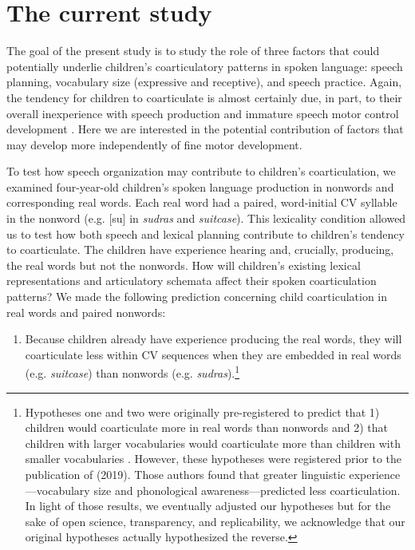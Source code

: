 \documentclass[a4paper,man,natbib,donotrepeattitle, apacite]{apa6}
\begin{document}
\section{The current study}

The goal of the present study is to study the role of three factors that could potentially underlie children’s coarticulatory patterns in spoken language: speech planning, vocabulary size (expressive and receptive), and speech practice. Again, the tendency for children to coarticulate is almost certainly due, in part, to their overall inexperience with speech production and immature speech motor control development \cite{barbierWhatAnticipatoryCoarticulation2020,goffmanRelationsSegmentalMotor2007,greenPhysiologicDevelopmentSpeech2000,rubertusDevelopmentGesturalOrganization2018,zharkovaDynamicsVoicelessSibilant2018}. Here we are interested in the potential contribution of factors that may develop more independently of fine motor development. 

To test how speech organization may contribute to children’s coarticulation, we examined four-year-old children’s spoken language production in nonwords and corresponding real words. Each real word had a paired, word-initial CV syllable in the nonword (e.g. [su] in \textit{sudras} and \textit{suitcase}). This lexicality condition allowed us to test how both speech and lexical planning contribute to children’s tendency to coarticulate. The children have experience hearing and, crucially, producing, the real words but not the nonwords. How will children’s existing lexical representations and articulatory schemata affect their spoken coarticulation patterns? We made the following prediction concerning child coarticulation in real words and paired nonwords:

\begin{enumerate}
\item[1.] Because children already have experience producing the real words, they will coarticulate less within CV sequences when they are embedded in real words (e.g. \textit{suitcase}) than nonwords (e.g. \textit{sudras}).\footnote{Hypotheses one and two were originally pre-registered to predict that 1) children would coarticulate more in real words than nonwords and 2) that children with larger vocabularies would coarticulate more than children with smaller vocabularies \cite{cychoszSpectralTemporalMeasures2019}. However, these hypotheses were registered prior to the publication of \citeauthor{noiraySpokenLanguageDevelopment2019} (2019). Those authors found that greater linguistic experience---vocabulary size and phonological awareness---predicted less coarticulation. In light of those results, we eventually adjusted our hypotheses but for the sake of open science, transparency, and replicability, we acknowledge that our original hypotheses actually hypothesized the reverse.}

\end{enumerate}
\end{document}
